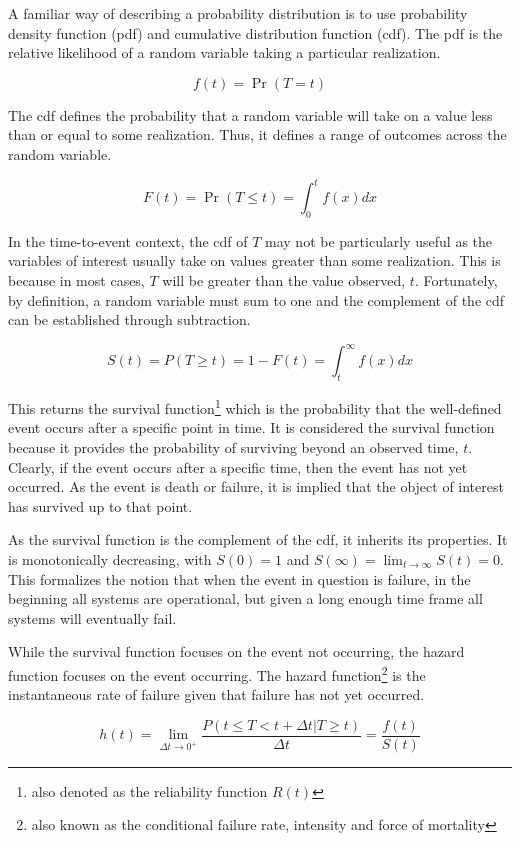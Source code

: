A familiar way of describing a probability distribution is to use probability density function (pdf) and cumulative distribution function (cdf). The pdf is the relative likelihood of a random variable taking a particular realization.

$$f(t) = \Pr(T = t)$$

The cdf defines the probability that a random variable will take on a value less than or equal to some realization. Thus, it defines a range of outcomes across the random variable.  

$$F(t) = \Pr(T \le t) = \int^t_0 f(x) dx $$

In the time-to-event context, the cdf of $T$ may not be particularly useful as the variables of interest usually take on values greater than some realization. This is because in most cases, $T$ will be greater than the value observed, $t$. Fortunately, by definition, a random variable must sum to one and the complement of the cdf can be established through subtraction.

$$S(t) = P(T \ge t) = 1 - F(t) = \int^{\infty}_t f(x) dx$$

This returns the survival function\footnote{also denoted as the reliability function $R(t)$} which is the probability
that the well-defined event occurs after a specific point in time. It is considered the survival function because it provides the probability of surviving beyond an observed time, $t$. Clearly, if the event occurs after a specific time, then the event has not yet occurred. As the event is death or failure, it is implied that the object of interest has survived up to that point.

As the survival function is the complement of the cdf, it inherits its properties. It is monotonically decreasing, with $S(0) = 1$ and $S(\infty) = \lim_{t\rightarrow \infty}S(t) = 0$. This formalizes the notion that when the event in question is failure, in the beginning all systems are operational, but given a long enough time frame all systems will eventually fail.

While the survival function focuses on the event not occurring, the hazard function focuses on the event occurring. The hazard function\footnote{also known as the conditional failure rate, intensity and force of mortality} is the instantaneous rate of failure given that failure has not yet occurred.

$$ h(t) = \lim_{\Delta t \rightarrow 0^+} \frac{P(t \le T < t + \Delta t | T \ge t)}{\Delta t} = \frac{f(t)}{S(t)} $$

